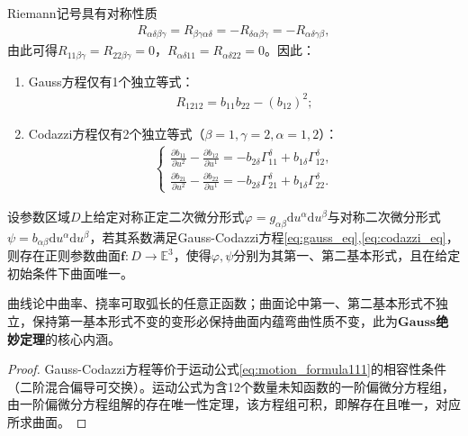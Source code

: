 \documentclass[../../main.tex]{subfiles}%
\begin{document}
\begin{remark}
Riemann记号具有对称性质
\begin{align*}
R_{\alpha\delta\beta\gamma} = R_{\beta\gamma\alpha\delta} = -R_{\delta\alpha\beta\gamma} = -R_{\alpha\delta\gamma\beta},
\end{align*}
由此可得$R_{11\beta\gamma}=R_{22\beta\gamma}=0$，$R_{\alpha\delta11}=R_{\alpha\delta22}=0$。因此：
\begin{enumerate}[(1)]
\item Gauss方程仅有1个独立等式：
\begin{align}
R_{1212} = b_{11}b_{22}-(b_{12})^2; \label{eq:gauss_indep}
\end{align}
\item Codazzi方程仅有2个独立等式（$\beta=1,\gamma=2,\alpha=1,2$）：
\begin{align}
\begin{cases}
\frac{\partial b_{11}}{\partial u^2}-\frac{\partial b_{12}}{\partial u^1} = -b_{2\delta}\Gamma^\delta_{11}+b_{1\delta}\Gamma^\delta_{12},\\
\frac{\partial b_{21}}{\partial u^2}-\frac{\partial b_{22}}{\partial u^1} = -b_{2\delta}\Gamma^\delta_{21}+b_{1\delta}\Gamma^\delta_{22}.
\end{cases} \label{eq:codazzi_indep}
\end{align}
\end{enumerate}
\end{remark}

\begin{theorem}[曲面基本形式存在唯一性定理]
设参数区域$D$上给定对称正定二次微分形式$\varphi=g_{\alpha\beta}\mathrm{d}u^\alpha\mathrm{d}u^\beta$与对称二次微分形式$\psi=b_{\alpha\beta}\mathrm{d}u^\alpha\mathrm{d}u^\beta$，若其系数满足Gauss-Codazzi方程\eqref{eq:gauss_eq},\eqref{eq:codazzi_eq}，则存在正则参数曲面$\boldsymbol{f}:D\to\mathbb{E}^3$，使得$\varphi,\psi$分别为其第一、第二基本形式，且在给定初始条件下曲面唯一。
\end{theorem}
\begin{remark}
曲线论中曲率、挠率可取弧长的任意正函数；曲面论中第一、第二基本形式不独立，保持第一基本形式不变的变形必保持曲面内蕴弯曲性质不变，此为$\mathbf{Gauss}$\textbf{绝妙定理}的核心内涵。
\end{remark}
\begin{proof}
Gauss-Codazzi方程等价于运动公式\eqref{eq:motion_formula111}的相容性条件（二阶混合偏导可交换）。运动公式为含12个数量未知函数的一阶偏微分方程组，由一阶偏微分方程组解的存在唯一性定理，该方程组可积，即解存在且唯一，对应所求曲面。
\end{proof}
\end{document}
